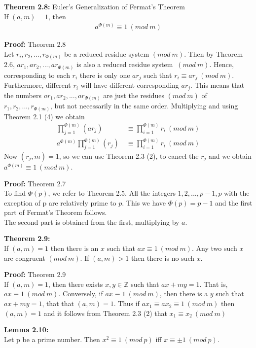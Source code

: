 \documentclass[a4paper]{article}
\begin{document}
\textbf{Theorem 2.8:} Euler's Generalization of Fermat's Theorem\\
If $(a,m)=1$, then
\begin{align}
    a^{\Phi(m)}\equiv 1\ (mod\ m)
\end{align}

\textbf{Proof:} Theorem 2.8\\
Let $r_i,r_2,...,r_{\Phi(m)}$ be a reduced residue system $(mod\ m)$. Then by Theorem 2.6, $ar_1,ar_2,...,ar_{\Phi(m)}$ is also a reduced residue system $\ (mod\ m)$.  Hence, corresponding to each $r_i$ there is only one $ar_j$ such that $r_i \equiv ar_j \ (mod\ m)$. Furthermore, different $r_i$ will have different corresponding $ar_j$. This means that the numbers $ar_1,ar_2,...,ar_{\Phi(m)}$ are just the residues $(mod\ m)$ of $r_1,r_2,...,r_{\Phi(m)}$, but not necessarily in the same order. Multiplying and using Theorem 2.1 (4) we obtain
\begin{align*}
                \prod_{j=1}^{\Phi(m)}(ar_j) &\equiv  \prod_{i=1}^{\Phi(m)} r_i \ (mod\ m)\\
    a^{\Phi(m)} \prod_{j=1}^{\Phi(m)}(r_j)\ &\equiv  \prod_{i=1}^{\Phi(m)} r_i \ (mod\ m)
\end{align*}
Now $(r_j,m)=1$, so we can use Theorem 2.3 (2), to cancel the $r_j$ and we obtain $a^{\Phi(m)} \equiv 1 \ (mod\ m)$.

\textbf{Proof:} Theorem 2.7\\
To find $\Phi(p)$, we refer to Theorem 2.5. All the integers $1,2,...,p-1,p$ with the exception of p are relatively prime to $p$. This we have $\Phi(p)=p-1$ and the first part of Fermat's Theorem follows.\\
The second part is obtained from the first, multiplying by $a$.

\textbf{Theorem 2.9:}\\
If $(a,m)=1$ then there is an $x$ such that $ax\equiv 1\ (mod\ m)$. Any two such $x$ are congruent $(mod\ m)$. If $(a,m)>1$ then there is no such $x$.

\textbf{Proof:} Theorem 2.9\\
If $(a,m)=1$, then there exists $x,y\in\mathbb{Z}$ such that $ax+my=1$. That is, $ax \equiv 1 \ (mod\ m)$. Conversely, if $ax \equiv 1 \ (mod\ m)$, then there is a $y$ such that $ax+my=1$, that that $(a,m)=1$. Thus if $ax_1 \equiv ax_2 \equiv 1 \ (mod\ m)$ then $(a,m)=1$ and it follows from Theorem 2.3 (2) that $x_1 \equiv x_2 \ (mod\ m)$

\textbf{Lemma 2.10:}\\
Let p be a prime number. Then $x^2\equiv 1\ (mod\ p)$ iff $x\equiv\pm 1\ (mod\ p)$.
\end{document}
